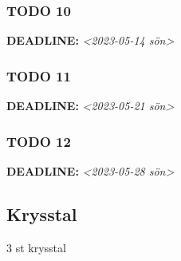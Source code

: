 \documentclass[11pt]{article}
\begin{document}
\subsubsection{{\bfseries\sffamily TODO} 10}
\label{sec:orgd7acc94}
\noindent\textbf{DEADLINE:} \textit{<2023-05-14 sön>}\\[0pt]
\subsubsection{{\bfseries\sffamily TODO} 11}
\label{sec:orgeb46580}
\noindent\textbf{DEADLINE:} \textit{<2023-05-21 sön>}\\[0pt]
\subsubsection{{\bfseries\sffamily TODO} 12}
\label{sec:org7ec86a2}
\noindent\textbf{DEADLINE:} \textit{<2023-05-28 sön>}\\[0pt]

\subsection{Krysstal}
\label{sec:org9990741}
3 st krysstal
\end{document}
